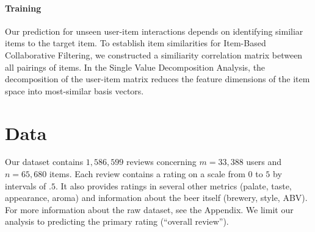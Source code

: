 \documentclass[12pt]{article}
\begin{document}

\paragraph{Training} Our prediction for unseen user-item interactions depends on identifying similiar items to the target item. To establish item similarities for Item-Based Collaborative Filtering, we constructed a similiarity correlation matrix between all pairings of items. In the Single Value Decomposition Analysis, the decomposition of the user-item matrix reduces the feature dimensions of the item space into most-similar basis vectors.



\section{Data}
Our dataset contains $1,586,599$ reviews concerning $m = 33,388$ users and $n = 65,680$ items. Each review contains a rating on a scale from $0$ to $5$ by intervals of $.5$. It also provides ratings in several other metrics (palate, taste, appearance, aroma) and information about the beer itself (brewery, style, ABV). For more information about the raw dataset, see the Appendix. We limit our analysis to predicting the primary rating (``overall review'').
\end{document}
